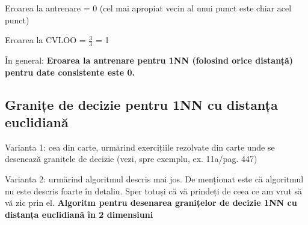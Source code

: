\documentclass[12pt]{article}
\begin{document}
	Eroarea la antrenare = 0 (cel mai apropiat vecin al unui punct este chiar acel punct)
	
	Eroarea la CVLOO = $\frac{3}{3}$ = 1
	
	În general: \textbf{Eroarea la antrenare pentru 1NN (folosind orice distanță) pentru date consistente este 0.}
	
	\subsection{Granițe de decizie pentru 1NN cu distanța euclidiană}
	
	Varianta 1: cea din carte, urmărind exercițiile rezolvate din carte unde se desenează granițele de decizie (vezi, spre exemplu, ex. 11a/pag. 447)
	
	Varianta 2: urmărind algoritmul descris mai jos. De menționat este că algoritmul nu este descris foarte în detaliu. Sper totuși că vă prindeți de ceea ce am vrut să vă zic prin el.
	\newpage
	\textbf{Algoritm pentru desenarea granițelor de decizie 1NN cu distanța euclidiană în 2 dimensiuni}
	
\end{document}
